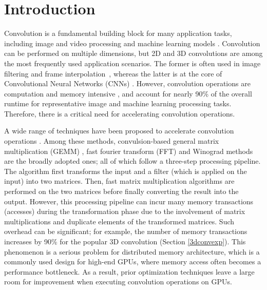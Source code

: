 \section{Introduction}
Convolution is a fundamental building block for many application tasks, including image and video processing and machine learning
models \cite{Perrot2014Fine,Ma2014Optimized,Rudi2015Image,Niklaus2017Video,Krizhevsky2012ImageNet,SimonyanZ14a,HeZRS16,SzegedyLJSRAEVR15}. Convolution can be performed on multiple dimensions, but 2D and 3D convolutions are among the most frequently used
application scenarios. The former is often used in image filtering and frame
interpolation~\cite{Perrot2014Fine,Ma2014Optimized,Rudi2015Image,Niklaus2017Video}, whereas the latter is at the core of Convolutional
Neural Networks (CNNs) \cite{Krizhevsky2012ImageNet,SimonyanZ14a,HeZRS16,SzegedyLJSRAEVR15}. However, convolution operations are computation and memory intensive \cite{cavigelli2015accelerating},
and account for nearly 90\% of the overall runtime \cite{Li2016Performance} for representative image and machine learning processing tasks.
Therefore, there is a critical need for accelerating convolution operations.


A wide range of techniques have been proposed to accelerate convolution operations \cite{Iandola2014Communication,vasilache2014fast,lavin2016fast,cho2017mec,Zhen2018Optimizing,Vasudevan2017Parallel,Chellapilla2006High,zhang2015dwarfcode}. Among these methods, convulsion-based general matrix multiplication (GEMM) \cite{Vasudevan2017Parallel,Chellapilla2006High}, fast fourier transform (FFT) \cite{vasilache2014fast} and Winograd \cite{lavin2016fast} methods are the broadly adopted ones;  all of which follow a three-step processing pipeline. The algorithm first transforms the input and a filter (which is applied on the input) into two matrices. Then, fast matrix multiplication algorithms \cite{karstadt2017matrix,scott2015matrix} are performed on the two matrices before finally converting the result into the output.
However, this processing pipeline can incur many memory transactions (accesses) during the
transformation phase due to the involvement of matrix multiplications and duplicate elements of the transformed
matrices. Such overhead can be significant; for example, the number of memory transactions increases
by 90\% for the popular 3D convolution (Section \ref{3dconvexp}). This phenomenon is a serious problem for distributed memory
architecture, which is a commonly used design for high-end GPUs, where memory access often becomes a performance bottleneck. As a
result, prior optimization techniques leave a large room for improvement when executing convolution operations on GPUs.


